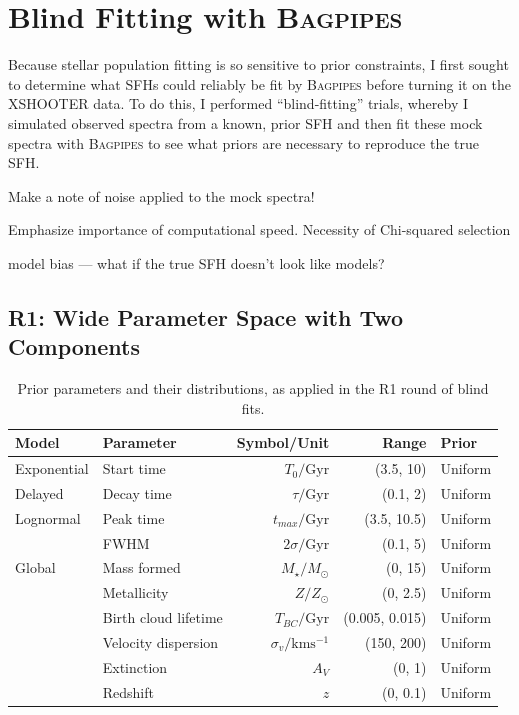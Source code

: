 \documentclass[a4paper,11pt]{article}
\begin{document}
\section{Blind Fitting with \textsc{Bagpipes}}\label{sec:blind_fitting}

Because stellar population fitting is so sensitive to prior constraints, I first sought to determine what SFHs could reliably be fit by \textsc{Bagpipes} before turning it on the XSHOOTER data. To do this, I performed ``blind-fitting'' trials, whereby I simulated observed spectra from a known, prior SFH and then fit these mock spectra with \textsc{Bagpipes} to see what priors are necessary to reproduce the true SFH.


Make a note of noise applied to the mock spectra!

Emphasize importance of computational speed. Necessity of Chi-squared selection

model bias --- what if the true SFH doesn't look like models?

\subsection{R1: Wide Parameter Space with Two Components}\label{sec:r1}

\begin{table}
  \centering
  \begin{tabular}{l l r r l}
    Model       & Parameter            & Symbol/Unit                  & Range          & Prior   \\
    \hline \hline
    Exponential & Start time           & $T_0/\mathrm{Gyr}$           & (3.5, 10)      & Uniform \\
    Delayed     & Decay time           & $\tau/\mathrm{Gyr}$          & (0.1, 2)       & Uniform \\
    \hline
    Lognormal   & Peak time            & $t_{max}/\mathrm{Gyr}$       & (3.5, 10.5)    & Uniform \\
                & FWHM                 & $2\sigma/\mathrm{Gyr}$       & (0.1, 5)       & Uniform \\
    \hline
    Global      & Mass formed          & $M_\star/M_\odot$            & (0, 15)        & Uniform \\
                & Metallicity          & $Z/Z_\odot$                  & (0, 2.5)       & Uniform \\
                & Birth cloud lifetime & $T_{BC}/\mathrm{Gyr}$        & (0.005, 0.015) & Uniform \\
                & Velocity dispersion  & $\sigma_v/\mathrm{kms^{-1}}$ & (150, 200)     & Uniform \\
                & Extinction           & $A_V$                        & (0, 1)         & Uniform \\
                & Redshift             & $z$                          & (0, 0.1)       & Uniform \\
    \hline
  \end{tabular}
  \caption{Prior parameters and their distributions, as applied in the R1 round of blind fits.}
  \label{tab:r1_priors}
\end{table}
\end{document}
